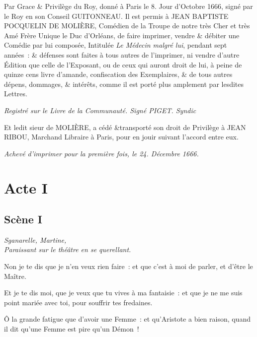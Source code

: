 \documentclass[french,twoside]{book} %
\newcommand{\speaker}[1]{\medskip{\centering #1\par\nopagebreak}} %
\newcommand\chapteropen{} %
\newcommand\chaptercont{} %
\begin{document}
\noindent Par Grace \& Privilège du Roy, donné à Paris le 8. Jour d’Octobre 1666, signé par le Roy en son Conseil GUITONNEAU. Il est permis à JEAN BAPTISTE POCQUELIN DE MOLIÈRE, Comédien de la Troupe de notre très Cher et très Amé Frère Unique le Duc d’Orléans, de faire imprimer, vendre \& débiter une Comédie par lui composée, Intitulée \emph{Le Médecin malgré lui}, pendant sept années : \& défenses sont faites à tous autres de l’imprimer, ni vendre d’autre Édition que celle de l’Exposant, ou de ceux qui auront droit de lui, à peine de quinze cens livre d’amande, confiscation des Exemplaires, \& de tous autres dépens, dommages, \& intérêts, comme il est porté plus amplement par lesdites Lettres.\par
{\itshape Registré sur le Livre de la Communauté. Signé PIGET. Syndic}\par
Et ledit sieur de MOLIÈRE, a cédé \&transporté son droit de Privilège à JEAN RIBOU, Marchand Libraire à Paris, pour en jouir suivant l’accord entre eux.\par
{\itshape Achevé d’imprimer pour la première fois, le 24. Décembre 1666.}

\mainmatter


\chapteropen

\chapter[{Acte I}]{Acte I}
\renewcommand{\leftmark}{Acte I}
\label{I}


\chaptercont

\section[{Scène I}]{Scène I}
\label{I01}

{\centering\it Sganarelle, Martine, \\
Paraissant sur le théâtre en se querellant.\par}\nobreakpage\bigskip\nobreakpage

\speaker{Sganarelle}
\noindent Non je te dis que je n’en veux rien faire : et que c’est à moi de parler, et d’être le Maître.

\speaker{Martine}
\noindent Et je te dis moi, que je veux que tu vives à ma fantaisie : et que je ne me suis point mariée avec toi, pour souffrir tes fredaines.

\speaker{Sganarelle}
\noindent Ô la grande fatigue que d’avoir une Femme : et qu’Aristote a bien raison, quand il dit qu’une Femme est pire qu’un Démon !
\end{document}
